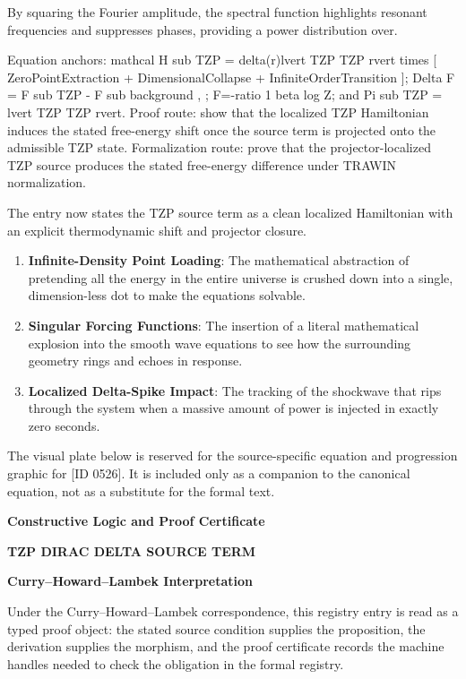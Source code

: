 By squaring the Fourier amplitude, the spectral function highlights resonant frequencies and suppresses phases, providing a power distribution over.

Equation anchors: mathcal H sub TZP = delta(r)lvert TZP TZP rvert times [ ZeroPointExtraction + DimensionalCollapse + InfiniteOrderTransition ]; Delta F = F sub TZP - F sub background , ; F=-ratio 1 beta log Z; and Pi sub TZP = lvert TZP TZP rvert. Proof route: show that the localized TZP Hamiltonian induces the stated free-energy shift once the source term is projected onto the admissible TZP state. Formalization route: prove that the projector-localized TZP source produces the stated free-energy difference under TRAWIN normalization.

The entry now states the TZP source term as a clean localized Hamiltonian with an explicit thermodynamic shift and projector closure.
\endgroup

\begin{enumerate}[leftmargin=1.6em,itemsep=6pt,topsep=4pt]
\item \textbf{Infinite-Density Point Loading}: The mathematical abstraction of pretending all the energy in the entire universe is crushed down into a single, dimension-less dot to make the equations solvable.
\item \textbf{Singular Forcing Functions}: The insertion of a literal mathematical explosion into the smooth wave equations to see how the surrounding geometry rings and echoes in response.
\item \textbf{Localized Delta-Spike Impact}: The tracking of the shockwave that rips through the system when a massive amount of power is injected in exactly zero seconds.
\end{enumerate}

\begingroup\footnotesize\sloppy
The visual plate below is reserved for the source-specific equation and progression graphic for [ID 0526]. It is included only as a companion to the canonical equation, not as a substitute for the formal text.
\par\endgroup
\ifTZPDarkEdition
{}
\fi

\clearpage
\begingroup\tzpsupportsetup
\noindent\textbf{\fontsize{10.8pt}{12.8pt}\selectfont [ID 0526] Constructive Logic and Proof Certificate}\par
\noindent\textbf{\fontsize{10pt}{12pt}\selectfont TZP DIRAC DELTA SOURCE TERM}\par
\vspace{0.45em}
\begingroup
\footnotesize
\setlength{\parskip}{0.22em}
\setlength{\parindent}{0pt}
\noindent\textbf{Curry--Howard--Lambek Interpretation}\par
Under the Curry--Howard--Lambek correspondence, this registry entry is read as a typed proof
object: the stated source condition supplies the proposition, the derivation supplies the
morphism, and the proof certificate records the machine handles needed to check the obligation
in the formal registry.

